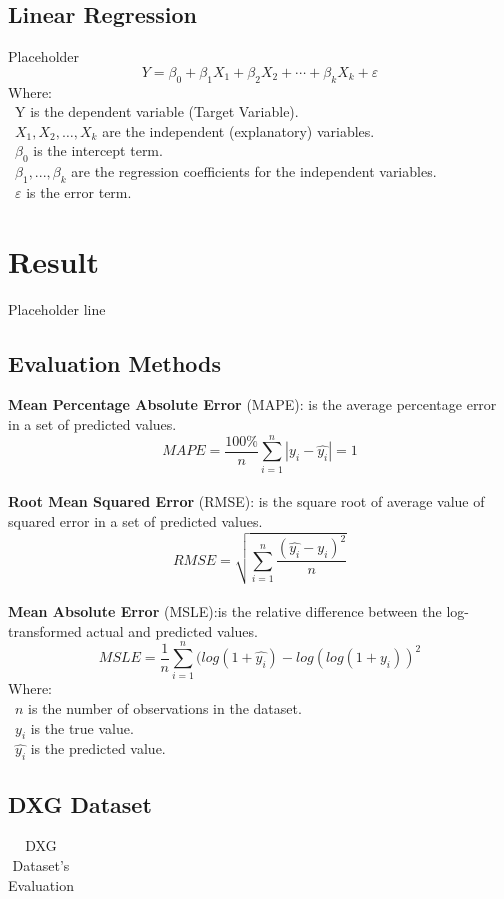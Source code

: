 \documentclass{ieeeojies}
\begin{document}
\subsection{Linear Regression}
Placeholder
\[Y=\beta_0+\beta_1X_1+\beta_2X_2+\cdots+\beta_kX_k+\varepsilon\]
Where:\\
	\indent\textbullet\ Y is the dependent variable (Target Variable).\\
	\indent\textbullet\ \(X_1, X_2, \ldots, X_k\) are the independent (explanatory) variables.\\
	\indent\textbullet\ \(\beta_0\) is the intercept term.\\
	\indent\textbullet\ \(\beta_1,..., \beta_k\) are the regression coefficients for the independent variables.\\
	\indent\textbullet\ \(\varepsilon\) is the error term.
 

\section{Result}
Placeholder line
\subsection{Evaluation Methods}
\textbf{Mean Percentage Absolute Error} (MAPE): is the average percentage error in a set of predicted values.\\
\[MAPE=\frac{100\%}{n}  \sum_{i=1}^{n} |y_i-\hat{y_i} |  = 1 \]\\
\textbf{Root Mean Squared Error} (RMSE): is the square root of average value of squared error in a set of predicted values.\\
\[RMSE=\sqrt{\sum_{i=1}^{n} \frac{(\hat{y_i}-y_i )^2}{n} }\]\\
\textbf{Mean Absolute Error} (MSLE):is the relative difference between the log-transformed actual and predicted values.\\
\[MSLE=\frac{1}{n}\sum_{i=1}^{n}(log(1+\hat{y_i})-log(log(1+y_i))^2\]
Where: \\
	\indent\textbullet\ \(n\) is the number of observations in the dataset.\\
	\indent\textbullet\ \(y_i\)  is the true value.\\
	\indent\textbullet\ \(\hat{y_i}\) is the predicted value.
\subsection{DXG Dataset} 
\begin{table}[H]
    \centering
    \begin{tabular}{|c|c|c|c|c|}
         
    \end{tabular}
    \caption{DXG Dataset's Evaluation}
    \label{vcbresult}
\end{table}
\end{document}
